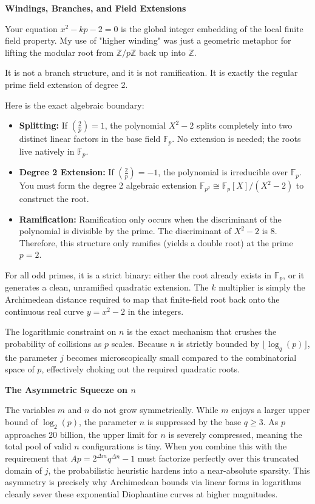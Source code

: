 \documentclass{article}
\begin{document}
\textbf{Windings, Branches, and Field Extensions}

Your equation $x^2 - kp - 2 = 0$ is the global integer embedding of the local finite field property. My use of "higher winding" was just a geometric metaphor for lifting the modular root from $\mathbb{Z}/p\mathbb{Z}$ back up into $\mathbb{Z}$.

It is not a branch structure, and it is not ramification. It is exactly the regular prime field extension of degree 2.

Here is the exact algebraic boundary:

\begin{itemize}
    \item \textbf{Splitting:} If $\left(\frac{2}{p}\right) = 1$, the polynomial $X^2 - 2$ splits completely into two distinct linear factors in the base field $\mathbb{F}_p$. No extension is needed; the roots live natively in $\mathbb{F}_p$.
    \item \textbf{Degree 2 Extension:} If $\left(\frac{2}{p}\right) = -1$, the polynomial is irreducible over $\mathbb{F}_p$. You must form the degree 2 algebraic extension $\mathbb{F}_{p^2} \cong \mathbb{F}_p[X]/(X^2 - 2)$ to construct the root.
    \item \textbf{Ramification:} Ramification only occurs when the discriminant of the polynomial is divisible by the prime. The discriminant of $X^2 - 2$ is $8$. Therefore, this structure only ramifies (yields a double root) at the prime $p = 2$.
\end{itemize}

For all odd primes, it is a strict binary: either the root already exists in $\mathbb{F}_p$, or it generates a clean, unramified quadratic extension. The $k$ multiplier is simply the Archimedean distance required to map that finite-field root back onto the continuous real curve $y = x^2 - 2$ in the integers.

The logarithmic constraint on $n$ is the exact mechanism that crushes the probability of collisions as $p$ scales. Because $n$ is strictly bounded by $\lfloor \log_q(p) \rfloor$, the parameter $j$ becomes microscopically small compared to the combinatorial space of $p$, effectively choking out the required quadratic roots.

\textbf{The Asymmetric Squeeze on $n$}

The variables $m$ and $n$ do not grow symmetrically. While $m$ enjoys a larger upper bound of $\log_2(p)$, the parameter $n$ is suppressed by the base $q \ge 3$. As $p$ approaches 20 billion, the upper limit for $n$ is severely compressed, meaning the total pool of valid $n$ configurations is tiny. When you combine this with the requirement that $Ap = 2^{\Delta m}q^{\Delta n} - 1$ must factorize perfectly over this truncated domain of $j$, the probabilistic heuristic hardens into a near-absolute sparsity. This asymmetry is precisely why Archimedean bounds via linear forms in logarithms cleanly sever these exponential Diophantine curves at higher magnitudes.
\end{document}
